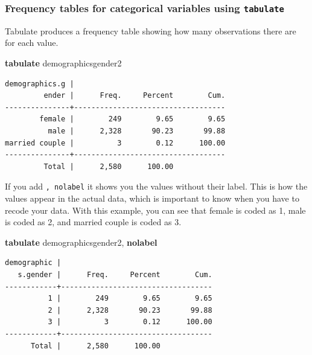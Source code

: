 \documentclass[
]{book}
\newenvironment{Shaded}{\begin{snugshade}}{\end{snugshade}}
\newcommand{\KeywordTok}[1]{\textcolor[rgb]{0.13,0.29,0.53}{\textbf{#1}}}
\newcommand{\NormalTok}[1]{#1}
\begin{document}
\hypertarget{tabulate}{%
\subsubsection*{\texorpdfstring{Frequency tables for categorical variables using \texttt{tabulate}}{Frequency tables for categorical variables using tabulate}}\label{tabulate}}

Tabulate produces a frequency table showing how many observations there are for each value.

\begin{Shaded}
\begin{Highlighting}[]
\KeywordTok{tabulate}\NormalTok{ demographicsgender2}
\end{Highlighting}
\end{Shaded}

\begin{verbatim}
demographics.g |
         ender |      Freq.     Percent        Cum.
---------------+-----------------------------------
        female |        249        9.65        9.65
          male |      2,328       90.23       99.88
married couple |          3        0.12      100.00
---------------+-----------------------------------
         Total |      2,580      100.00
\end{verbatim}

If you add \texttt{,\ nolabel} it shows you the values without their label. This is how the values appear in the actual data, which is important to know when you have to recode your data. With this example, you can see that female is coded as 1, male is coded as 2, and married couple is coded as 3.

\begin{Shaded}
\begin{Highlighting}[]
\KeywordTok{tabulate}\NormalTok{ demographicsgender2, }\KeywordTok{nolabel}
\end{Highlighting}
\end{Shaded}

\begin{verbatim}
demographic |
   s.gender |      Freq.     Percent        Cum.
------------+-----------------------------------
          1 |        249        9.65        9.65
          2 |      2,328       90.23       99.88
          3 |          3        0.12      100.00
------------+-----------------------------------
      Total |      2,580      100.00
\end{verbatim}
\end{document}

